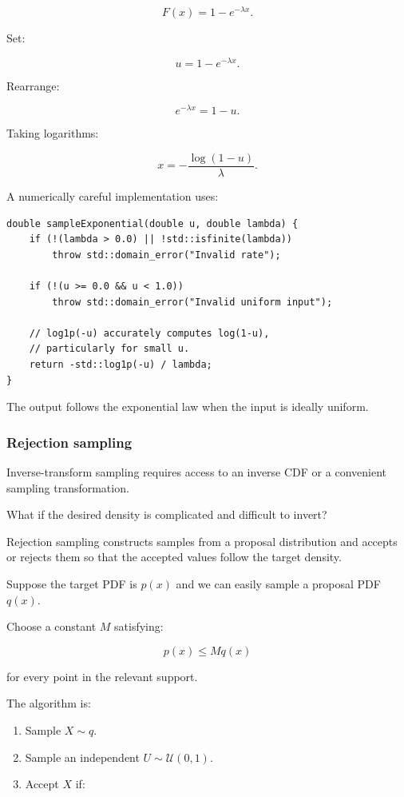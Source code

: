 \[
 F(x)=1-e^{-\lambda x}.
\]

Set:

\[
 u=1-e^{-\lambda x}.
\]

Rearrange:

\[
 e^{-\lambda x}=1-u.
\]

Taking logarithms:

\[
 \boxed{ x=-\frac{\log(1-u)}{\lambda} }.
\]

A numerically careful implementation uses:

\begin{verbatim}
double sampleExponential(double u, double lambda) {
    if (!(lambda > 0.0) || !std::isfinite(lambda))
        throw std::domain_error("Invalid rate");

    if (!(u >= 0.0 && u < 1.0))
        throw std::domain_error("Invalid uniform input");

    // log1p(-u) accurately computes log(1-u),
    // particularly for small u.
    return -std::log1p(-u) / lambda;
}
\end{verbatim}

The output follows the exponential law when the input is ideally uniform.

\subsubsection{Rejection sampling}\label{02-foundations-ii-ch029-rejection-sampling}

\hypertarget{02-foundations-ii-ch029-rejection-sampling}{}

Inverse-transform sampling requires access to an inverse CDF or a convenient sampling transformation.

What if the desired density is complicated and difficult to invert?

Rejection sampling constructs samples from a proposal distribution and accepts or rejects them so that the accepted values follow the target density.

Suppose the target PDF is \(p(x)\) and we can easily sample a proposal PDF \(q(x)\).

Choose a constant \(M\) satisfying:

\[
 \boxed{ p(x)\le Mq(x) }
\]

for every point in the relevant support.

The algorithm is:

\begin{enumerate}
\def\labelenumi{\arabic{enumi}.}
\tightlist
\item
  Sample \(X\sim q\).
\item
  Sample an independent \(U\sim\mathcal U(0,1)\).
\item
  Accept \(X\) if:
\end{enumerate}

